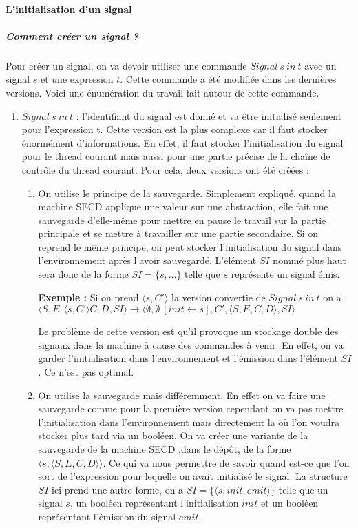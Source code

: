\documentclass[10pt,a4paper]{report}
\begin{document}
\paragraph{L'initialisation d'un signal}

\subparagraph{Comment créer un signal ?}
Pour créer un signal, on va devoir utiliser une commande $Signal~s~in~t$ avec un signal $s$ et une expression $t$. Cette commande a été modifiée dans les dernières versions. Voici une énumération du travail fait autour de cette commande.
\smallbreak
\begin{enumerate}
\item $Signal~s~in~t$ : l'identifiant du signal est donné et va être initialisé seulement pour l'expression t. Cette version est la plus complexe car il faut stocker énormément d'informations. En effet, il faut stocker l'initialisation du signal pour le thread courant mais aussi pour une partie précise de la chaîne de contrôle du thread courant. Pour cela, deux versions ont été créées :
  \begin{enumerate}
  \item On utilise le principe de la sauvegarde. Simplement expliqué, quand la machine SECD applique une valeur sur une abstraction, elle fait une sauvegarde d'elle-même pour mettre en pause le travail sur la partie principale et se mettre à travailler sur une partie secondaire. Si on reprend le même principe, on peut stocker l'initialisation du signal dans l'environnement après l'avoir sauvegardé. L'élément $SI$ nommé plus haut sera donc de la forme $SI=\{s,...\}$ telle que $s$ représente un signal émis.
    \medbreak
    
    \textbf{Exemple :} Si on prend $\langle s,C'\rangle$ la version convertie de $Signal~s~in~t$ on a : 
    \\$\langle S,E,\langle s,C'\rangle C,D,SI\rangle \longrightarrow \langle \emptyset,\emptyset~[init \leftarrow s],C',\langle S,E,C,D\rangle,SI\rangle$  
    \medbreak
    
    Le problème de cette version est qu'il provoque un stockage double des signaux dans la machine à cause des commandes à venir. En effet, on va garder l'initialisation dans l'environnement et l'émission dans l'élément $SI$. Ce n'est pas optimal.
    
  \item On utilise la sauvegarde mais différemment. En effet on va faire une sauvegarde comme pour la première version cependant on va pas mettre l'initialisation dans l'environnement mais directement la où l'on voudra stocker plus tard via un booléen. On va créer une variante de la sauvegarde de la machine SECD ,dans le dépôt, de la forme $\langle s,\langle S,E,C,D\rangle\rangle$. Ce qui va nous permettre de savoir quand est-ce que l'on sort de l'expression pour lequelle on avait initialisé le signal. La structure $SI$ ici prend une autre forme, on a $SI=\{\langle s,init,emit\rangle\}$ telle que un signal $s$, un booléen représentant l'initialisation $init$  et un booléen représentant l'émission du signal $emit$.
    \medbreak
    

\end{enumerate}
\end{enumerate}
\end{document}
